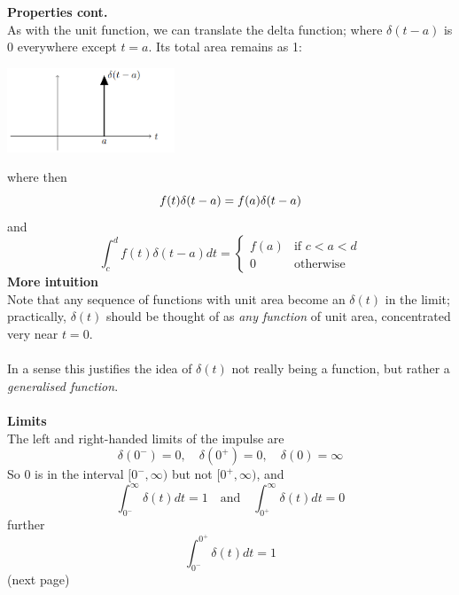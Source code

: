\documentclass{report}
\begin{document}
\noindent\textbf{Properties cont.}\\
As with the unit function, we can translate the delta function; 
where $\delta(t-a)$ is 0 everywhere except $t=a$. Its total area remains as 1:
\begin{center}
\includegraphics[width=5cm]{47}\\
\end{center}
where then
\begin{equation*}
f(t)\delta(t-a)=f(a)\delta(t-a)\\
\end{equation*}
and
\begin{equation*}
\int^d_cf(t)\delta(t-a)dt=\begin{cases}
f(a)&\text{if }c<a<d\\
0&\text{otherwise}
\end{cases}
\end{equation*}
\textbf{More intuition}\\
Note that any sequence of functions with unit area become an $\delta(t)$ in the limit;
practically, $\delta(t)$ should be thought of as \textit{any function} of unit area, concentrated very near $t=0$.\\
\vspace{1mm}\\
In a sense this justifies the idea of $\delta(t)$ not really being a function, but rather a 
\textit{generalised function}.\\
\vspace{1mm}\\
\textbf{Limits}\\
The left and right-handed limits of the impulse are
\begin{equation*}
\delta(0^-)=0,\quad\delta(0^+)=0,\quad\delta(0)=\infty
\end{equation*}
So 0 is in the interval $[0^-,\infty)$ but not $[0^+,\infty)$, and
\begin{equation*}
\int^\infty_{0^-}\delta(t)dt=1\quad\text{and}\quad\int^\infty_{0^+}\delta(t)dt=0
\end{equation*}
further
\begin{equation*}
\int^{0^+}_{0^-}\delta(t)dt=1
\end{equation*}
(next page)\newpage
\end{document}
